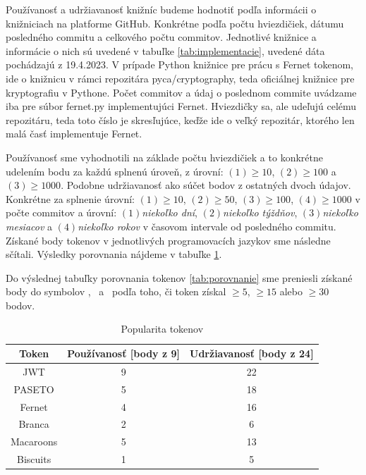 Používanosť a udržiavanosť knižníc budeme hodnotiť podľa informácii o knižniciach na platforme GitHub. Konkrétne podľa počtu hviezdičiek, dátumu posledného commitu a celkového počtu commitov. Jednotlivé knižnice a informácie o nich sú uvedené v tabuľke \ref{tab:implementacie}, uvedené dáta pochádzajú z 19.4.2023. V prípade Python knižnice pre prácu s Fernet tokenom, ide o knižnicu v rámci repozitára pyca/cryptography, teda oficiálnej knižnice pre kryptografiu v Pythone. Počet commitov a údaj o poslednom commite uvádzame iba pre súbor fernet.py implementujúci Fernet. Hviezdičky sa, ale udeľujú celému repozitáru, teda toto číslo je skresľujúce, keďže ide o veľký repozitár, ktorého len malá časť implementuje Fernet. 

Používanosť sme vyhodnotili na základe počtu hviezdičiek a to konkrétne udelením bodu za každú splnenú úroveň, z úrovní: $(1)\ge10$, $(2)\ge100$ a $(3)\ge1000$. Podobne udržiavanosť ako súčet bodov z ostatných dvoch údajov. Konkrétne za splnenie úrovní: $(1)\ge10$, $(2)\ge50$, $(3)\ge100$, $(4)\ge1000$ v počte commitov a úrovní: $(1)$\textit{niekoľko dní}, $(2)$\textit{niekoľko týždňov}, $(3)$\textit{niekoľko mesiacov} a $(4)$\textit{niekoľko rokov} v časovom intervale od posledného commitu. Získané body tokenov v jednotlivých programovacích jazykov sme následne sčítali. Výsledky porovnania nájdeme v tabuľke \ref{tab:popularita}.

Do výslednej tabuľky porovnania tokenov \ref{tab:porovnanie} sme preniesli získané body do symbolov \Circle, \LEFTcircle ~a \CIRCLE ~podľa toho, či token získal $\ge5$, $\ge15$ alebo $\ge30$ bodov.

\begin{table}
  \begin{center}
    \caption{Popularita tokenov}
    \label{tab:popularita} %

    \begin{tabular}{ccc}
      \hline
      Token & Používanosť [body z 9] & Udržiavanosť [body z 24]\\
      \hline
      JWT & 9 & 22 \\
      PASETO & 5 & 18 \\
      Fernet & 4 & 16 \\
      Branca & 2 & 6 \\
      Macaroons & 5 & 13 \\
      Biscuits & 1 & 5 \\
      \hline
    \end{tabular}
  \end{center}
\end{table}